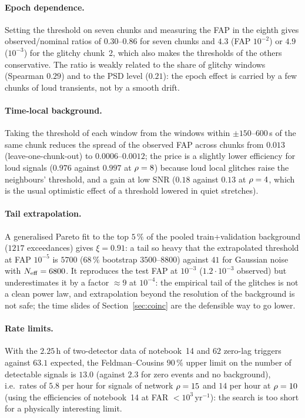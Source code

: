\paragraph{Epoch dependence.} Setting the threshold on seven chunks and measuring the FAP in the eighth gives observed/nominal ratios of $0.30$--$0.86$ for seven chunks and $4.3$ (FAP $10^{-2}$) or $4.9$ ($10^{-3}$) for the glitchy chunk~2, which also makes the thresholds of the others conservative. The ratio is weakly related to the share of glitchy windows (Spearman $0.29$) and to the PSD level ($0.21$): the epoch effect is carried by a few chunks of loud transients, not by a smooth drift.
\paragraph{Time-local background.} Taking the threshold of each window from the windows within $\pm150$--$600\,$s of the same chunk reduces the spread of the observed FAP across chunks from $0.013$ (leave-one-chunk-out) to $0.0006$--$0.0012$; the price is a slightly lower efficiency for loud signals ($0.976$ against $0.997$ at $\rho=8$) because loud local glitches raise the neighbours' threshold, and a gain at low SNR ($0.18$ against $0.13$ at $\rho=4$, which is the usual optimistic effect of a threshold lowered in quiet stretches).
\paragraph{Tail extrapolation.} A generalised Pareto fit to the top $5\,\%$ of the pooled train+validation background ($1217$ exceedances) gives $\xi=0.91$: a tail so heavy that the extrapolated threshold at FAP $10^{-5}$ is $5700$ ($68\,\%$ bootstrap $3500$--$8800$) against $41$ for Gaussian noise with $N_{\rm eff}=6800$. It reproduces the test FAP at $10^{-3}$ ($1.2\cdot10^{-3}$ observed) but underestimates it by a factor $\approx9$ at $10^{-4}$: the empirical tail of the glitches is not a clean power law, and extrapolation beyond the resolution of the background is not safe; the time slides of Section~\ref{sec:coinc} are the defensible way to go lower.
\paragraph{Rate limits.} With the $2.25\,$h of two-detector data of notebook~14 and $62$ zero-lag triggers against $63.1$ expected, the Feldman--Cousins $90\,\%$ upper limit on the number of detectable signals is $13.0$ (against $2.3$ for zero events and no background), i.e.\ rates of $5.8$ per hour for signals of network $\rho=15$ and $14$ per hour at $\rho=10$ (using the efficiencies of notebook~14 at FAR $<10^3\,\mathrm{yr}^{-1}$): the search is too short for a physically interesting limit.
